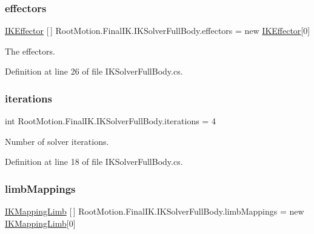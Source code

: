 \subsubsection{\texorpdfstring{effectors}{effectors}}
{\footnotesize\ttfamily \mbox{\hyperlink{class_root_motion_1_1_final_i_k_1_1_i_k_effector}{I\+K\+Effector}} \mbox{[}$\,$\mbox{]} Root\+Motion.\+Final\+I\+K.\+I\+K\+Solver\+Full\+Body.\+effectors = new \mbox{\hyperlink{class_root_motion_1_1_final_i_k_1_1_i_k_effector}{I\+K\+Effector}}\mbox{[}0\mbox{]}}



The effectors. 



Definition at line 26 of file I\+K\+Solver\+Full\+Body.\+cs.

\mbox{\label{class_root_motion_1_1_final_i_k_1_1_i_k_solver_full_body_a1c5503fc656cad2bdb10bfc511760424}} 
\subsubsection{\texorpdfstring{iterations}{iterations}}
{\footnotesize\ttfamily int Root\+Motion.\+Final\+I\+K.\+I\+K\+Solver\+Full\+Body.\+iterations = 4}



Number of solver iterations. 



Definition at line 18 of file I\+K\+Solver\+Full\+Body.\+cs.

\mbox{\label{class_root_motion_1_1_final_i_k_1_1_i_k_solver_full_body_a5161bd901ca157bc668292d518fd4c9b}} 
\subsubsection{\texorpdfstring{limb\+Mappings}{limbMappings}}
{\footnotesize\ttfamily \mbox{\hyperlink{class_root_motion_1_1_final_i_k_1_1_i_k_mapping_limb}{I\+K\+Mapping\+Limb}} \mbox{[}$\,$\mbox{]} Root\+Motion.\+Final\+I\+K.\+I\+K\+Solver\+Full\+Body.\+limb\+Mappings = new \mbox{\hyperlink{class_root_motion_1_1_final_i_k_1_1_i_k_mapping_limb}{I\+K\+Mapping\+Limb}}\mbox{[}0\mbox{]}}



